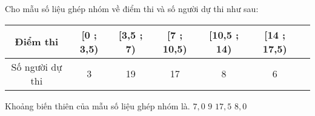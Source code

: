 \documentclass[12pt,a4paper]{article}
\begin{document}
\begin{ex}
 Cho mẫu số liệu ghép nhóm về điểm thi và số người dự thi như sau:
 
\begin{center}\begin{tabular}{|c|c|c|c|c|c|c|}
        \hline
        Điểm thi   & [0 ; 3,5) & [3,5 ; 7) & [7 ; 10,5) & [10,5 ; 14) & [14 ; 17,5)\\  
        \hline 
        Số người dự thi & 3 & 19 & 17 & 8 & 6 \\ 
        \hline 
    \end{tabular}
\end{center}
 Khoảng biến thiên của mẫu số liệu ghép nhóm là.
\choice
{ $ {7,0}$ }
   { $ {9}$ }
     { \True ${17,5}$ }
    { $ {8,0}$ }
\end{ex}
\end{document}
